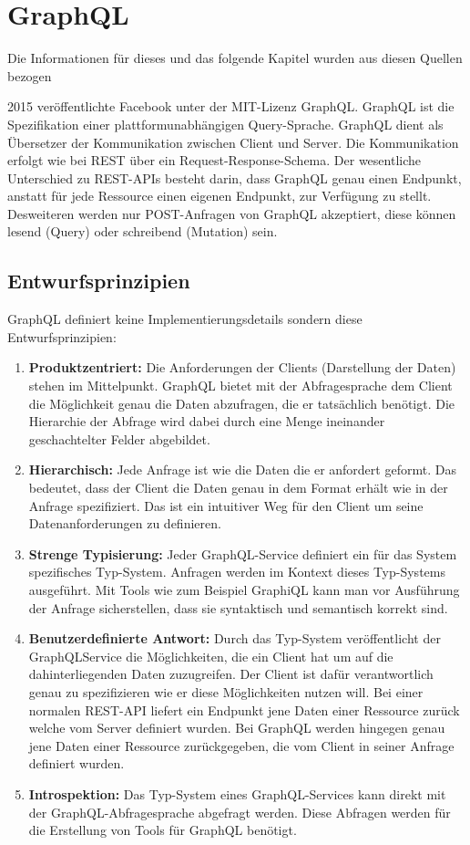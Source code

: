 \documentclass[bachelor, german ]{hgbthesis}
\begin{document}
\section{GraphQL}
Die Informationen für dieses und das folgende Kapitel wurden aus diesen Quellen bezogen \cite{kress2020graphql, graphqlOnline, dgraphOnline, rakutenGraphQLVsRest}
\newline


2015 veröffentlichte Facebook unter der MIT-Lizenz GraphQL. GraphQL ist die Spezifikation einer plattformunabhängigen Query-Sprache. GraphQL dient als Übersetzer der Kommunikation zwischen Client und Server.
Die Kommunikation erfolgt wie bei REST über ein Request-Response-Schema.
Der wesentliche Unterschied zu REST-APIs besteht darin, dass GraphQL genau einen Endpunkt, anstatt für jede Ressource einen eigenen Endpunkt, zur Verfügung zu stellt.
Desweiteren werden nur POST-Anfragen von GraphQL akzeptiert, diese können lesend (Query) oder schreibend (Mutation) sein.

\subsection{Entwurfsprinzipien}
GraphQL definiert keine Implementierungsdetails sondern diese Entwurfsprinzipien:
\begin{enumerate}
    \item \textbf{Produktzentriert:}
    Die Anforderungen der Clients (Darstellung der Daten) stehen im Mittelpunkt. GraphQL bietet mit der Abfragesprache dem Client die Möglichkeit genau die Daten abzufragen, die er tatsächlich benötigt. Die Hierarchie der
    Abfrage wird dabei durch eine Menge ineinander geschachtelter Felder abgebildet.
    \item \textbf{Hierarchisch:}
    Jede Anfrage ist wie die Daten die er anfordert geformt.
    Das bedeutet, dass der Client die Daten genau in dem Format erhält wie in der Anfrage spezifiziert. Das ist ein intuitiver Weg für den Client um seine Datenanforderungen zu definieren.
    \item \textbf{Strenge Typisierung:}
    Jeder GraphQL-Service definiert ein für das System spezifisches Typ-System. Anfragen werden im Kontext dieses Typ-Systems ausgeführt.
    Mit Tools wie zum Beispiel GraphiQL kann man vor Ausführung der Anfrage sicherstellen, dass sie syntaktisch und semantisch korrekt sind.
    \item \textbf{Benutzerdefinierte Antwort:}
    Durch das Typ-System veröffentlicht der GraphQLService die Möglichkeiten, die ein Client hat um auf die dahinterliegenden Daten zuzugreifen.
    Der Client ist dafür verantwortlich genau zu spezifizieren wie er diese Möglichkeiten nutzen will.
    Bei einer normalen REST-API liefert ein Endpunkt jene Daten einer Ressource zurück welche vom Server definiert wurden.
    Bei GraphQL werden hingegen genau jene Daten einer Ressource zurückgegeben, die vom Client in seiner Anfrage definiert wurden.
    \item \textbf{Introspektion:}
    Das Typ-System eines GraphQL-Services kann direkt mit der GraphQL-Abfragesprache abgefragt werden. Diese Abfragen werden für die Erstellung von Tools für GraphQL benötigt.
\end{enumerate}
\end{document}

